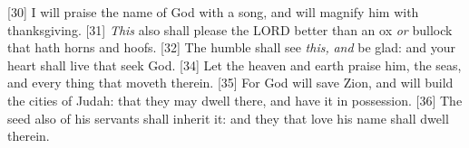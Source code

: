 [30] \textcolor[cmyk]{0.99998,1,0,0}{I will praise the name of God with a song, and will magnify him with thanksgiving.}
[31] \textcolor[cmyk]{0.99998,1,0,0}{\emph{This} also shall please the LORD better than an ox \emph{or} bullock that hath horns and hoofs.}
[32] \textcolor[cmyk]{0.99998,1,0,0}{The humble shall see \emph{this,} \emph{and} be glad: and your heart shall live that seek God.}
[34] \textcolor[cmyk]{0.99998,1,0,0}{Let the heaven and earth praise him, the seas, and every thing that moveth therein.}
[35] \textcolor[cmyk]{0.99998,1,0,0}{For God will save Zion, and will build the cities of Judah: that they may dwell there, and have it in possession.}
[36] \textcolor[cmyk]{0.99998,1,0,0}{The seed also of his servants shall inherit it: and they that love his name shall dwell therein.} %
